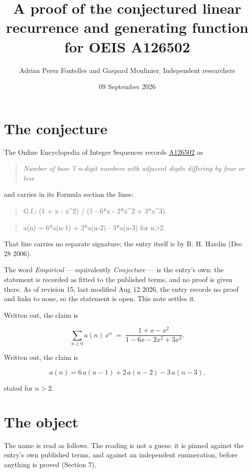 \documentclass[11pt]{article}
\title{A proof of the conjectured linear recurrence and generating function for OEIS A126502}
\author{Adrian Perez Fontelles and Gaspard Moulinier, Independent researchers}
\date{09 September 2026}
\theoremstyle{definition}
\begin{document}
\maketitle
\section{The conjecture}

The Online Encyclopedia of Integer Sequences records \href{https://oeis.org/A126502}{A126502} as

\begin{quote}\itshape Number of base 7 n-digit numbers with adjacent digits differing by four or less\end{quote}

and carries in its Formula section the lines:

\begin{quote}\ttfamily G.f.: (1 + x - x\textasciicircum{}2) / (1 - 6*x - 2*x\textasciicircum{}2 + 3*x\textasciicircum{}3).\end{quote}

\begin{quote}\ttfamily a(n) = 6*a(n-1) + 2*a(n-2) - 3*a(n-3) for n>2.\end{quote}

That line carries no separate signature; the entry itself is by R. H. Hardin (Dec 28 2006).

The word {\itshape Empirical} --- equivalently {\itshape Conjecture} --- is the entry's own: the statement is recorded as fitted to the published terms, and no proof is given there. As of revision 15, last modified Aug 12 2026, the entry records no proof and links to none, so the statement is open. This note settles it.

Written out, the claim is

\[\sum_{n \ge 0} a(n)\,x^n \;=\; \frac{1 + x - x^{2}}{1 - 6x - 2x^{2} + 3x^{3}}.\]

Written out, the claim is

\[a(n) = 6\,a(n-1) + 2\,a(n-2) - 3\,a(n-3).\]

stated for $n > 2$.

\section{The object}

The name is read as follows. The reading is not a guess: it is pinned against the entry's own published terms, and against an independent enumeration, before anything is proved (Section 7).
\end{document}
